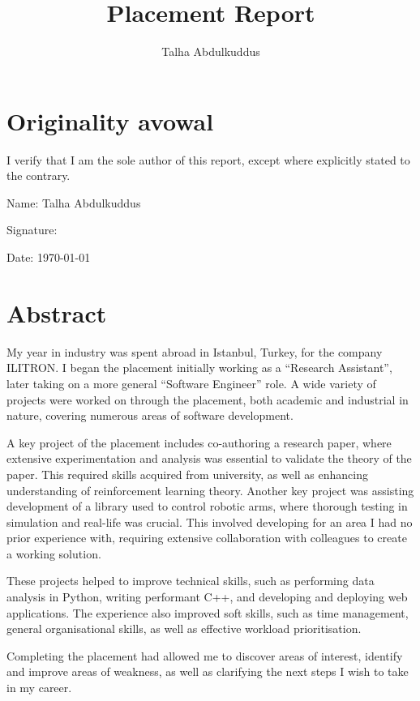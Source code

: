 \documentclass[british,12pt,a4paper]{report}
\begin{document}
\title{Placement Report}
\author{Talha Abdulkuddus}


\setcounter{page}{2} %

\vfill

\section*{Originality avowal}

I verify that I am the sole author of this report, except where explicitly stated to the contrary.

\bigskip

Name: Talha Abdulkuddus

\medskip

Signature:


\medskip

Date: \today

\vfill

\section*{Abstract}

My year in industry was spent abroad in Istanbul, Turkey, for the company ILITRON\@. I began the
placement initially working as a \enquote{Research Assistant}, later taking on a more general
\enquote{Software Engineer} role. A wide variety of projects were worked on through the placement,
both academic and industrial in nature, covering numerous areas of software development.

A key project of the placement includes co-authoring a research paper, where extensive
experimentation and analysis was essential to validate the theory of the paper. This required skills
acquired from university, as well as enhancing understanding of reinforcement learning theory.
Another key project was assisting development of a library used to control robotic arms, where
thorough testing in simulation and real-life was crucial. This involved developing for an area I had
no prior experience with, requiring extensive collaboration with colleagues to create a working
solution.

These projects helped to improve technical skills, such as performing data analysis in Python,
writing performant C++, and developing and deploying web applications. The experience also improved
soft skills, such as time management, general organisational skills, as well as effective workload
prioritisation.

Completing the placement had allowed me to discover areas of interest, identify and improve areas of
weakness, as well as clarifying the next steps I wish to take in my career.

\vfill

\tableofcontents
\listoffigures





\printglossary[type=\acronymtype]
\printglossary[type=main]
\printbibliography
\end{document}
